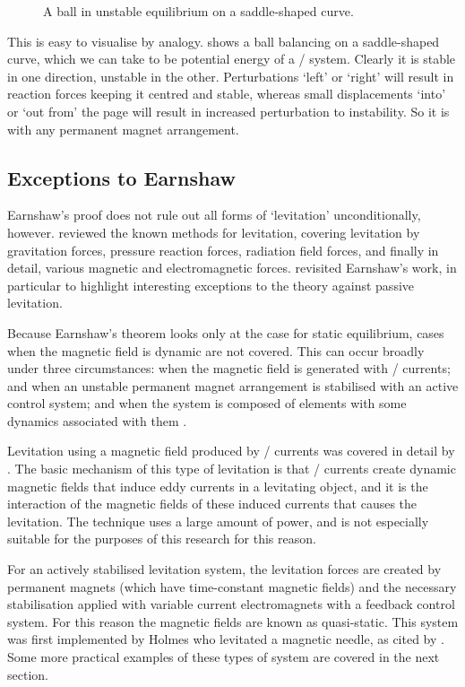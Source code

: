 \begin{figure}
  \caption{A ball in unstable equilibrium on a saddle-shaped curve.}
\end{figure}

This is easy to visualise by analogy.
 shows a ball balancing on a saddle-shaped curve, which we can take to be potential energy of a \twoD/ system.
Clearly it is stable in one direction, unstable in the other.
Perturbations `left' or `right' will result in reaction forces keeping it centred and stable, whereas small displacements `into' or `out from' the page will result in increased perturbation to instability.
So it is with any permanent magnet arrangement.

\subsection{Exceptions to Earnshaw}

Earnshaw's proof does not rule out all forms of `levitation' unconditionally, however.
\textcite{boerdijk1956a} reviewed the known methods for levitation, covering levitation by gravitation forces, pressure reaction forces, radiation field forces, and finally in detail, various magnetic and electromagnetic forces.
\textcite{bassani2006} revisited Earnshaw's work, in particular to highlight interesting exceptions to the theory against passive levitation.

Because Earnshaw's theorem looks only at the case for static equilibrium, cases when the magnetic field is dynamic are not covered.
This can occur broadly under three circumstances: when the magnetic field is generated with \AC/ currents; and when an unstable permanent magnet arrangement is stabilised with an active control system; and when the system is composed of elements with some dynamics associated with them 
.

Levitation using a magnetic field produced by \AC/ currents was covered in detail by \textcite{laithwaite1965}.
The basic mechanism of this type of levitation is that \AC/ currents create dynamic magnetic fields that induce eddy currents in a levitating object, and it is the interaction of the magnetic fields of these induced currents that causes the levitation.
The technique uses a large amount of power, and is not especially suitable for the purposes of this research for this reason.

For an actively stabilised levitation system, the levitation forces are created by permanent magnets (which have time-constant magnetic fields) and the necessary stabilisation applied with variable current electromagnets with a feedback control system.
For this reason the magnetic fields are known as quasi-static.
This system was first implemented by Holmes who levitated a magnetic needle, as cited by \textcite{boerdijk1956a}.
Some more practical examples of these types of system are covered in the next section.

